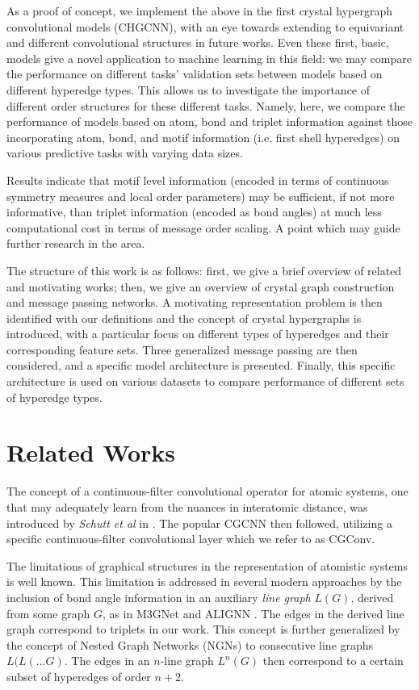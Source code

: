 \documentclass[10pt,a4paper]{article}
\begin{document}
As a proof of concept, we implement the above in the first crystal hypergraph convolutional models (CHGCNN), with an eye towards extending to equivariant and different convolutional structures in future works. Even these first, basic, models give a novel application to machine learning in this field: we may compare the performance on different tasks' validation sets between models based on different hyperedge types. This allows us to investigate the importance of different order structures for these different tasks. Namely, here, we compare the performance of models based on atom, bond and triplet information against those incorporating atom, bond, and motif information (i.e. first shell hyperedges) on various predictive tasks with varying data sizes. 

Results indicate that motif level information (encoded in terms of continuous symmetry measures and local order parameters) may be sufficient, if not more informative, than triplet information (encoded as bond angles) at much less computational cost in terms of message order scaling. A point which may guide further research in the area.

The structure of this work is as follows: first, we give a brief overview of related and motivating works; then, we give an overview of crystal graph construction and message passing networks. A motivating representation problem is then identified with our definitions and the concept of crystal hypergraphs is introduced, with a particular focus on different types of hyperedges and their corresponding feature sets. Three generalized message passing are then considered, and a specific model architecture is presented. Finally, this specific architecture is used on various datasets to compare performance of different sets of hyperedge types.

\section{Related Works}
The concept of a continuous-filter convolutional operator for atomic systems, one that may adequately learn from the nuances in interatomic distance, was introduced by \textit{Schutt et al} in \cite{schnet}. The popular CGCNN \cite{cgcnn} then followed, utilizing a specific continuous-filter convolutional layer which we refer to as CGConv. 

The limitations of graphical structures in the representation of atomistic systems is well known. This limitation is addressed in several modern approaches by the inclusion of bond angle information in an auxiliary \textit{line graph} $L(G)$, derived from some graph $G$, as in M3GNet \cite{m3gnet} and ALIGNN \cite{alignn}. The edges in the derived line graph correspond to triplets in our work. This concept is further generalized by the concept of Nested Graph Networks (NGNs) to consecutive line graphs $L(L(...G)$. The edges in an $n$-line graph $L^n(G)$ then correspond to a certain subset of hyperedges of order $n+2$.
\end{document}
